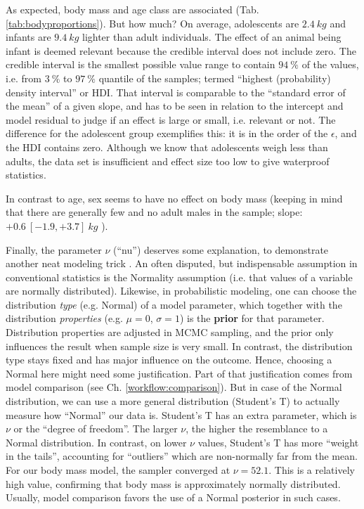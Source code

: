 As expected, body mass and age class are associated (Tab. \ref{tab:bodyproportions}).
But how much?
On average, adolescents are \(2.4\ kg\) and infants are \(9.4\ kg\) lighter than adult individuals.
The effect of an animal being infant is deemed relevant because the credible interval does not include zero.
The credible interval is the smallest possible value range to contain \(94\ \%\) of the values, i.e. from \(3\ \%\) to \(97\ \%\) quantile of the samples; termed ``highest (probability) density interval'' or HDI.
That interval is comparable to the ``standard error of the mean'' of a given slope, and has to be seen in relation to the intercept and model residual to judge if an effect is large or small, i.e. relevant or not.
The difference for the adolescent group exemplifies this: it is in the order of the \(\epsilon\), and the HDI contains zero.
Although we know that adolescents weigh less than adults, the data set is insufficient and effect size too low to give waterproof statistics.

In contrast to age, sex seems to have no effect on body mass (keeping in mind that there are generally few and no adult males in the sample; slope: \(+0.6\ [-1.9, +3.7]\ kg\) ).

Finally, the parameter \(\nu\) (``nu'') deserves some explanation, to demonstrate another neat modeling trick \citep{Wiecki2013}.
An often disputed, but indispensable assumption in conventional statistics is the Normality assumption (i.e. that values of a variable are normally distributed).
Likewise, in probabilistic modeling, one can choose the distribution \emph{type} (e.g. Normal) of a model parameter, which together with the distribution \emph{properties} (e.g. \(\mu = 0\), \(\sigma = 1\)) is the \textbf{prior} for that parameter.
Distribution properties are adjusted in MCMC sampling, and the prior only influences the result when sample size is very small.
In contrast, the distribution type stays fixed and has major influence on the outcome.
Hence, choosing a Normal here might need some justification.
Part of that justification comes from model comparison (see Ch. \ref{workflow:comparison}).
But in case of the Normal distribution, we can use a more general distribution (Student's T) to actually measure how ``Normal'' our data is.
Student's T has an extra parameter, which is \(\nu\) or the ``degree of freedom''.
The larger \(\nu\), the higher the resemblance to a Normal distribution.
In contrast, on lower \(\nu\) values, Student's T has more ``weight in the tails'', accounting for ``outliers'' which are non-normally far from the mean.
For our body mass model, the sampler converged at \(\nu = 52.1\).
This is a relatively high value, confirming that body mass is approximately normally distributed.
Usually, model comparison favors the use of a Normal posterior in such cases.


